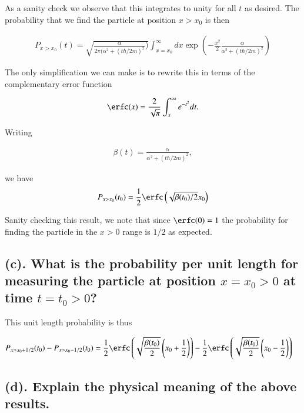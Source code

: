 As a sanity check we observe that this integrates to unity for all $t$ as desired.  The probability that we find the particle at position $x > x_0$ is then

\begin{align}\label{eqn:qmIproblemSet3:111}
P_{x>x_0}(t) = \sqrt{\frac{ \alpha }{ 2 \pi (\alpha^2 + (t \hbar/2m)^2 }) }
\int_{x=x_0}^\infty dx \exp\left( - \frac{x^2}{2} 
\frac{\alpha}{\alpha^2 + (t \hbar/2m)^2 } 
\right)
\end{align}

The only simplification we can make is to rewrite this in terms of the complementary error function

\begin{align}\label{eqn:qmIproblemSet3:112}
\erfc(x) = \frac{2}{\sqrt{\pi}} \int_x^\infty e^{-t^2} dt.
\end{align}

Writing

\begin{align}\label{eqn:qmIproblemSet3:113}
\beta(t) = \frac{\alpha}{\alpha^2 + (t \hbar/2m)^2 },
\end{align}

we have
\begin{align}\label{eqn:qmIproblemSet3:114}
P_{x>x_0}(t_0) = \inv{2} \erfc \left( \sqrt{\beta(t_0)/2} x_0 \right)
\end{align}

Sanity checking this result, we note that since $\erfc(0) = 1$ the probability for finding the particle in the $x>0$ range is $1/2$ as expected.


\subsection{(c). What is the probability per unit length for measuring the particle at position $x=x_0>0$ at time $t=t_0>0$? }

This unit length probability is thus

\begin{align}\label{eqn:qmIproblemSet3:115}
P_{x>x_0+1/2}(t_0) - P_{x>x_0-1/2}(t_0) 
&=
\inv{2} \erfc\left( \sqrt{\frac{\beta(t_0)}{2}} \left(x_0+\inv{2} \right) \right) 
-\inv{2} \erfc\left( \sqrt{\frac{\beta(t_0)}{2}} \left(x_0-\inv{2} \right) \right) 
\end{align}

\subsection{(d). Explain the physical meaning of the above results.}

